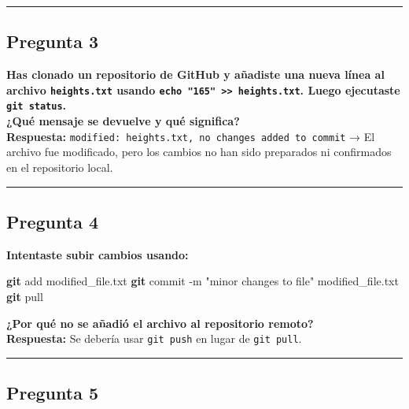 \documentclass[
]{article}
\newenvironment{Shaded}{\begin{snugshade}}{\end{snugshade}}
\newcommand{\AttributeTok}[1]{\textcolor[rgb]{0.13,0.29,0.53}{#1}}
\newcommand{\FunctionTok}[1]{\textcolor[rgb]{0.13,0.29,0.53}{\textbf{#1}}}
\newcommand{\NormalTok}[1]{#1}
\newcommand{\StringTok}[1]{\textcolor[rgb]{0.31,0.60,0.02}{#1}}
\begin{document}
\begin{center}\rule{0.5\linewidth}{0.5pt}\end{center}

\subsection{Pregunta 3}\label{pregunta-3}

\textbf{Has clonado un repositorio de GitHub y añadiste una nueva línea
al archivo \texttt{heights.txt} usando
\texttt{echo\ "165"\ \textgreater{}\textgreater{}\ heights.txt}. Luego
ejecutaste \texttt{git\ status}.}\\
\textbf{¿Qué mensaje se devuelve y qué significa?}\\
\textbf{Respuesta:}
\texttt{modified:\ heights.txt,\ no\ changes\ added\ to\ commit} → El
archivo fue modificado, pero los cambios no han sido preparados ni
confirmados en el repositorio local.

\begin{center}\rule{0.5\linewidth}{0.5pt}\end{center}

\subsection{Pregunta 4}\label{pregunta-4}

\textbf{Intentaste subir cambios usando:}

\begin{Shaded}
\begin{Highlighting}[]
\FunctionTok{git}\NormalTok{ add modified\_file.txt}
\FunctionTok{git}\NormalTok{ commit }\AttributeTok{{-}m} \StringTok{"minor changes to file"}\NormalTok{ modified\_file.txt}
\FunctionTok{git}\NormalTok{ pull}
\end{Highlighting}
\end{Shaded}

\textbf{¿Por qué no se añadió el archivo al repositorio remoto?}\\
\textbf{Respuesta:} Se debería usar \texttt{git\ push} en lugar de
\texttt{git\ pull}.

\begin{center}\rule{0.5\linewidth}{0.5pt}\end{center}

\subsection{Pregunta 5}\label{pregunta-5}
\end{document}
